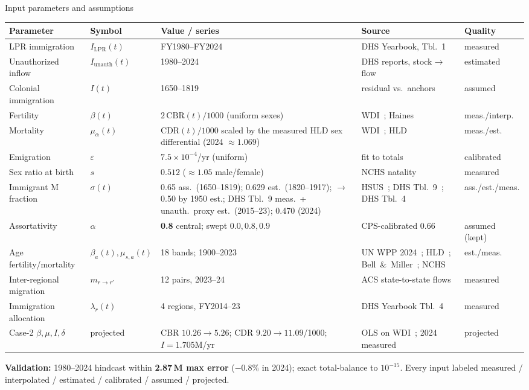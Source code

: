 \documentclass[10pt]{beamer}
\begin{document}
\begin{frame}{Input parameters and assumptions}
  \tiny
  \begin{tabular}{@{}lllp{2.6cm}l@{}}
    \toprule
    Parameter & Symbol & Value / series & Source & Quality \\
    \midrule
    LPR immigration & $I_{\mathrm{LPR}}(t)$ & FY1980--FY2024 & DHS Yearbook, Tbl.~1~\cite{dhs-yearbook} & measured \\
    Unauthorized inflow & $I_{\mathrm{unauth}}(t)$ & 1980--2024 & DHS reports, stock$\to$flow~\cite{dhs-unauth} & estimated \\
    Colonial immigration & $I(t)$ & 1650--1819 & residual vs.\ anchors~\cite{census-hsus} & assumed \\
    Fertility & $\beta(t)$ & $2\,\mathrm{CBR}(t)/1000$ (uniform sexes) & WDI~\cite{wdi}; Haines~\cite{haines} & meas./interp. \\
    Mortality & $\mu_\alpha(t)$ & $\mathrm{CDR}(t)/1000$ scaled by the measured HLD sex differential (2024 $\approx 1.069$) & WDI~\cite{wdi}; HLD~\cite{hld} & meas./est. \\
    Emigration & $\varepsilon$ & $7.5{\times}10^{-4}$/yr (uniform) & fit to totals~\cite{census-decennial} & calibrated \\
    Sex ratio at birth & $s$ & $0.512$ ($\approx 1.05$ male/female) & NCHS natality~\cite{nchs-natality} & measured \\
    Immigrant M fraction & $\sigma(t)$ & 0.65 ass.\ (1650--1819); 0.629 est.\ (1820--1917); $\to$0.50 by 1950 est.; DHS Tbl.~9 meas.\ + unauth.\ proxy est.\ (2015--23); 0.470 (2024) & HSUS~\cite{hsus-immig}; DHS Tbl.~9~\cite{dhs-lpr-sex}; DHS Tbl.~4~\cite{dhs-unauth-table4} & ass./est./meas. \\
    Assortativity & $\alpha$ & \textbf{0.8} central; swept $0.0,0.8,0.9$ & CPS-calibrated $0.66$~\cite{cps-asec-2024,p23-214} & assumed (kept) \\
    Age fertility/mortality & $\beta_a(t),\mu_{s,a}(t)$ & 18 bands; 1900--2023 & UN WPP 2024~\cite{unwpp-2024}; HLD~\cite{hld}; Bell~\&~Miller~\cite{bell-miller}; NCHS~\cite{nchs-lifetables} & est./meas. \\
    Inter-regional migration & $m_{r\to r'}$ & 12 pairs, 2023--24 & ACS state-to-state flows~\cite{acs-migration} & measured \\
    Immigration allocation & $\lambda_r(t)$ & 4 regions, FY2014--23 & DHS Yearbook Tbl.~4~\cite{dhs-table4} & measured \\
    Case-2 $\beta,\mu,I,\delta$ & projected & CBR $10.26{\to}5.26$; CDR $9.20{\to}11.09$/1000; $I{=}1.705$M/yr & OLS on WDI~\cite{wdi}; 2024 measured & projected \\
    \bottomrule
  \end{tabular}
  \vspace{0.5em}

  \textbf{Validation:} 1980--2024 hindcast within \textbf{2.87\,M max error} ($-0.8\%$ in 2024); exact total-balance to $10^{-15}$. Every input labeled measured / interpolated / estimated / calibrated / assumed / projected.
\end{frame}
\end{document}
